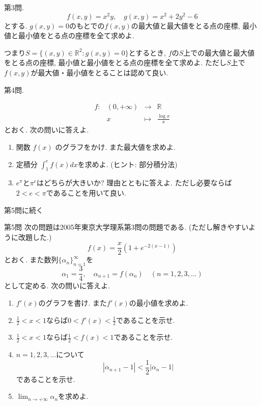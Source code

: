 \documentclass[dvipdfmx,a4paper,11pt]{article}
\newcommand{\R}{\mathbb{R}}
\theoremstyle{definition}
\begin{document}
  
 \vspace{14pt}
{\Large 第3問.} 
$$f(x,y) = x^2y, \quad g(x,y) = x^2+2y^2-6$$とする.
$g(x,y) =0$のもとでの$f(x,y)$の最大値と最大値をとる点の座標, 最小値と最小値をとる点の座標を全て求めよ. 

 \vspace{4pt}
つまり$S = \{ (x,y) \in \R^2: g(x,y)=0\}$とするとき, $f$の$S$上での最大値と最大値をとる点の座標, 最小値と最小値をとる点の座標を全て求めよ. ただし$S$上で$f(x,y)$が最大値・最小値をとることは認めて良い.
 
  \vspace{14pt}
{\Large 第4問.} 

 $$
\begin{array}{cccc}
f: &(0, +\infty)& \rightarrow & \R  \\
&x& \longmapsto & \frac{\log x}{x}
\end{array}
$$
とおく.  次の問いに答えよ.
  \begin{enumerate}
 \item 関数 $f(x) $ のグラフをかけ. また最大値を求めよ.　
 \item 定積分 $\int_{1}^{e} f(x) dx$を求めよ. (ヒント: 部分積分法)
 \item $e^\pi$と$\pi^e$はどちらが大きいか? 理由とともに答えよ. ただし必要ならば$2<e<\pi$であることを用いて良い. 
 \end{enumerate}

 


 

\begin{flushright}
\LARGE{第5問に続く}
\end{flushright}

\newpage 

{\Large 第5問}  次の問題は2005年東京大学理系第3問の問題である. (ただし解きやすいように改題した.)
$$
f(x) = \frac{x}{2}\left( 1 + e^{-2(x-1)}\right)
$$ 
とおく.  また数列$\{ \alpha_{n}\}_{n=1}^{\infty}$を
$$
\alpha_1 =\frac{3}{4}, \quad  \alpha_{n+1} = f(\alpha_{n}) \quad (n=1,2,3,\ldots)
$$
として定める. 次の問いに答えよ. 
\begin{enumerate}
 \item $f'(x)$のグラフを書け. また$f'(x)$の最小値を求めよ. 
 \item $\frac{1}{2} < x < 1$ならば$0 < f' (x) < \frac{1}{2}$であることを示せ.
 \item $\frac{1}{2} < x < 1$ならば$\frac{1}{2} < f(x) < 1$であることを示せ. 
\item  $n=1,2,3,\ldots$について
$$
| \alpha_{n+1} - 1| <\frac{1}{2}|\alpha_n -1|
$$
であることを示せ.
\item $\lim_{n \to +\infty} \alpha_n$を求めよ.
\end{enumerate}
\end{document}
